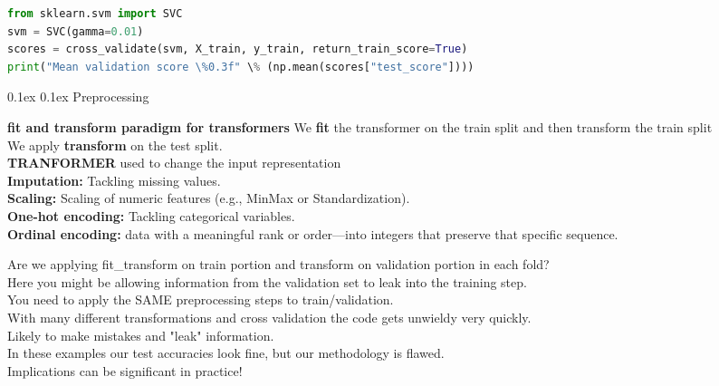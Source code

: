 \documentclass[8pt,landscape]{article}
\makeatletter
\renewcommand{\subsection}{\@startsection{subsection}{2}{0pt}%
    {0.1ex}%
    {0.1ex}%
    {\fontsize{8}{9}\bfseries\color{blue}}} %
\newcommand{\smalltext}[1]{%
  {\fontsize{8}{9}\selectfont\sloppy #1\par}%
}
\makeatother
\begin{document}
\begin{multicols}{3}
\begin{lstlisting}[language=Python]
from sklearn.svm import SVC
svm = SVC(gamma=0.01)
scores = cross_validate(svm, X_train, y_train, return_train_score=True)
print("Mean validation score \%0.3f" \% (np.mean(scores["test_score"])))
\end{lstlisting}

\subsection{Preprocessing}
\smalltext{
\textbf{fit and transform paradigm for transformers}
We \textbf{fit} the transformer on the train split and then transform the train split\\
We apply \textbf{transform} on the test split. \\
\textbf{TRANFORMER} used to change the input representation \\
\textbf{Imputation:} Tackling missing values. \\
\textbf{Scaling:} Scaling of numeric features (e.g., MinMax or Standardization). \\
\textbf{One-hot encoding:} Tackling categorical variables. \\
\textbf{Ordinal encoding:} data with a meaningful rank or order—into integers that preserve that specific sequence.
}
\smalltext{
Are we applying fit\_transform on train portion and transform on validation portion in each fold? \\
Here you might be allowing information from the validation set to leak into the training step. \\
You need to apply the SAME preprocessing steps to train/validation. \\
With many different transformations and cross validation the code gets unwieldy very quickly. \\
Likely to make mistakes and "leak" information. \\
In these examples our test accuracies look fine, but our methodology is flawed. \\
Implications can be significant in practice! \\
}


\end{multicols}
\end{document}
